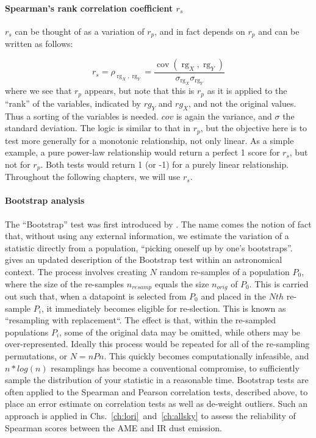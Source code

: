     \paragraph{Spearman's rank correlation coefficient $r_{s}$}
     $r_{s}$ can be thought of as a variation of $r_{p}$, and in fact depends on $r_{p}$ and can be written as follows:

       \begin{equation}
         r_s = \rho_{\operatorname{rg}_X,\operatorname{rg}_Y} = \frac {\operatorname{cov}(\operatorname{rg}_X,\operatorname{rg}_Y)} { \sigma_{\operatorname{rg}_X} \sigma_{\operatorname{rg}_Y} }
       \end{equation}
       where we see that $r_{p}$ appears, but note that this is $r_{p}$ as it is applied to the ``rank'' of the variables, indicated by $rg_{Y}$ and $rg_{X}$, and not the original values. Thus a sorting of the variables is needed. $cov$ is again the variance, and $\sigma{}$ the standard deviation.
       The logic is similar to that in $r_{p}$, but the objective here is to test more generally for a monotonic relationship, not only linear. As a simple example, a pure power-law relationship would return a perfect 1 score for $r_{s}$, but not for $r_{p}$. Both tests would return 1 (or -1) for a purely linear relationship. Throughout the following chapters, we will use $r_{s}$.

    \paragraph{Bootstrap analysis}
    The ``Bootstrap'' test was first introduced by \cite{efron79}. The name comes the notion of fact that, without using any external information, we estimate the variation of a statistic directly from a population, ``picking oneself up by one's bootstraps''. \cite{feigelson13} gives an updated description of the Bootstrap test within an astronomical context. The process involves creating $N$ random re-samples of a population $P_{0}$, where the size of the re-samples $n_{resamp}$ equals the size $n_{orig}$ of $P_{0}$. This is carried out such that, when a datapoint is selected from $P_{0}$ and placed in the $Nth$ re-sample $P_{i}$, it immediately becomes eligible for re-slection. This is known as ``resampling with replacement``. The effect is that, within the re-sampled populations $P_{i}$, some of the original data may be omitted, while others may be over-represented. Ideally this process would be repeated for all of the re-sampling permutations, or $N = nPn$. This quickly becomes computationally infeasible, and $n*log(n)$ resamplings has become a conventional compromise, to sufficiently sample the distribution of your statistic in a reasonable time. Bootstrap tests are often applied to the Spearman and Pearson correlation tests, described above, to place an error estimate on correlation tests as well as de-weight outliers. Such an approach is applied in Chs.~\ref{ch:lori}~and~\ref{ch:allsky} to assess the reliability of Spearman scores between the AME and IR dust emission.
